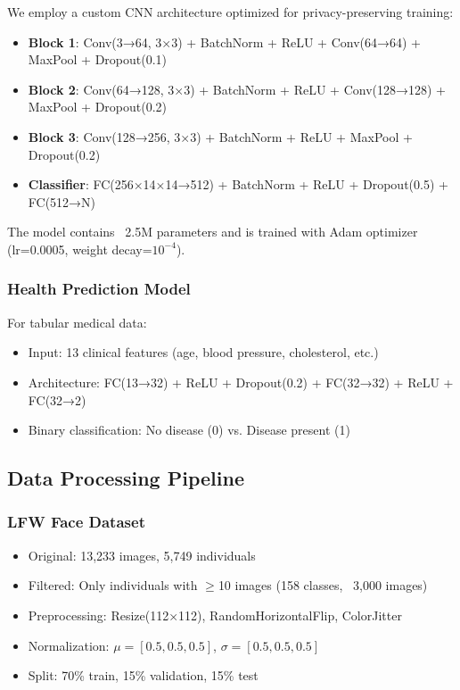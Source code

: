 \documentclass[conference]{IEEEtran}
\begin{document}
We employ a custom CNN architecture optimized for privacy-preserving training:

\begin{itemize}
    \item \textbf{Block 1}: Conv(3→64, 3×3) + BatchNorm + ReLU + Conv(64→64) + MaxPool + Dropout(0.1)
    \item \textbf{Block 2}: Conv(64→128, 3×3) + BatchNorm + ReLU + Conv(128→128) + MaxPool + Dropout(0.2)
    \item \textbf{Block 3}: Conv(128→256, 3×3) + BatchNorm + ReLU + MaxPool + Dropout(0.2)
    \item \textbf{Classifier}: FC(256×14×14→512) + BatchNorm + ReLU + Dropout(0.5) + FC(512→N)
\end{itemize}

The model contains ~2.5M parameters and is trained with Adam optimizer (lr=0.0005, weight decay=$10^{-4}$).

\subsubsection{Health Prediction Model}

For tabular medical data:

\begin{itemize}
    \item Input: 13 clinical features (age, blood pressure, cholesterol, etc.)
    \item Architecture: FC(13→32) + ReLU + Dropout(0.2) + FC(32→32) + ReLU + FC(32→2)
    \item Binary classification: No disease (0) vs. Disease present (1)
\end{itemize}

\subsection{Data Processing Pipeline}

\subsubsection{LFW Face Dataset}

\begin{itemize}
    \item Original: 13,233 images, 5,749 individuals
    \item Filtered: Only individuals with $\geq$10 images (158 classes, ~3,000 images)
    \item Preprocessing: Resize(112×112), RandomHorizontalFlip, ColorJitter
    \item Normalization: $\mu=[0.5, 0.5, 0.5]$, $\sigma=[0.5, 0.5, 0.5]$
    \item Split: 70\% train, 15\% validation, 15\% test
\end{itemize}
\end{document}
